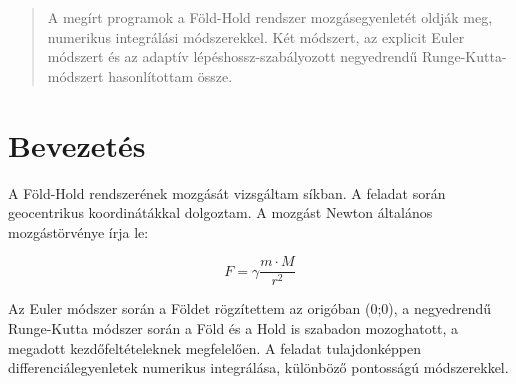 \documentclass[a4paper, 12pt]{article}
\begin{document}
\newpage


\thispagestyle{empty}  
  \vspace*{3cm}
\begin{abstract}
A megírt programok a Föld-Hold rendszer mozgásegyenletét oldják meg, numerikus integrálási módszerekkel. Két módszert, az explicit Euler módszert és az  adaptív lépéshossz-szabályozott negyedrendű Runge-Kutta-módszert hasonlítottam össze.
\end{abstract}

\newpage \vspace*{1cm}
\thispagestyle{plain}                                                                                                                                             
\tableofcontents

\vspace*{1cm}
\listoffigures

\vspace*{1cm}

\newpage
\pagestyle{fancy}
 \setcounter{page}{1}
\vspace*{1cm}



\section{Bevezetés}
\label{sec:bev}

A Föld-Hold rendszerének mozgását vizsgáltam síkban. A feladat során geocentrikus koordinátákkal dolgoztam. A mozgást Newton általános mozgástörvénye írja le:
\begin{center}
\begin{equation}
\label{newtequ}
F=\gamma\frac{m\cdot M}{r^2}
\end{equation}
\end{center}
Az Euler módszer során a Földet rögzítettem az origóban (0;0), a negyedrendű Runge-Kutta módszer során a Föld és a Hold is szabadon mozoghatott, a megadott kezdőfeltételeknek megfelelően. A feladat tulajdonképpen differenciálegyenletek numerikus integrálása, különböző pontosságú módszerekkel.
\end{document}
